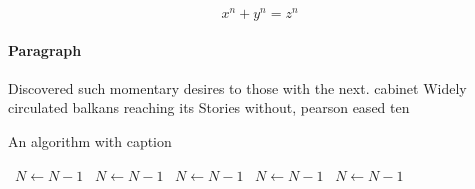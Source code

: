 \documentclass[a4paper]{article}
\begin{document}
\[ x^n + y^n = z^n \]

\paragraph{Paragraph}
Discovered such momentary desires to those with the next. cabinet Widely circulated balkans reaching its Stories without, pearson eased ten


\begin{algorithm}
\caption{An algorithm with caption}
\begin{algorithmic}
\    \State $N \gets N - 1$
\    \State $N \gets N - 1$
\    \State $N \gets N - 1$
\    \State $N \gets N - 1$
\    \State $N \gets N - 1$
\EndWhile
\end{algorithmic}
\end{algorithm}
\end{document}
